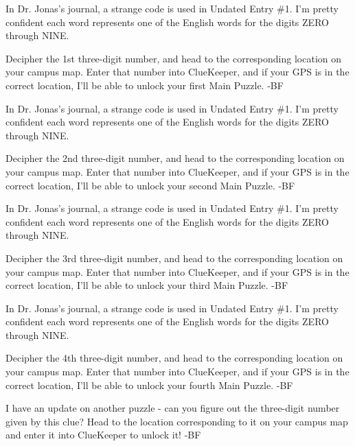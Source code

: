 
In Dr. Jonas's journal, a strange code is used in
Undated Entry \#1. I'm pretty confident each word
represents one of the English words for the
digits ZERO through NINE.

Decipher the 1st three-digit number, and head
to the corresponding location on your campus map.
Enter that number into ClueKeeper, and if your GPS
is in the correct location, I'll be able to unlock
your first Main Puzzle. -BF


In Dr. Jonas's journal, a strange code is used in
Undated Entry \#1. I'm pretty confident each word
represents one of the English words for the
digits ZERO through NINE.

Decipher the 2nd three-digit number, and head
to the corresponding location on your campus map.
Enter that number into ClueKeeper, and if your GPS
is in the correct location, I'll be able to unlock
your second Main Puzzle. -BF


In Dr. Jonas's journal, a strange code is used in
Undated Entry \#1. I'm pretty confident each word
represents one of the English words for the
digits ZERO through NINE.

Decipher the 3rd three-digit number, and head
to the corresponding location on your campus map.
Enter that number into ClueKeeper, and if your GPS
is in the correct location, I'll be able to unlock
your third Main Puzzle. -BF


In Dr. Jonas's journal, a strange code is used in
Undated Entry \#1. I'm pretty confident each word
represents one of the English words for the
digits ZERO through NINE.

Decipher the 4th three-digit number, and head
to the corresponding location on your campus map.
Enter that number into ClueKeeper, and if your GPS
is in the correct location, I'll be able to unlock
your fourth Main Puzzle. -BF

\newpage


I have an update on another puzzle - can you
figure out the three-digit number given by
this clue? Head to the location corresponding
to it on your campus map and enter it into
ClueKeeper to unlock it! -BF

